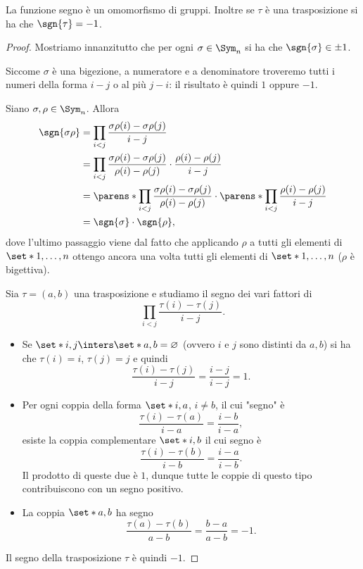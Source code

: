 \begin{proposition}
    {}{}
    La funzione segno è un omomorfismo di gruppi. Inoltre se $\tau$ è una trasposizione si ha che $\sgn{\tau} = -1$. 
\end{proposition}
\begin{proof}
     Mostriamo innanzitutto che per ogni $\sigma \in \Sym_n$ si ha che $\sgn{\sigma} \in {\pm 1}$.
    
    Siccome $\sigma$ è una bigezione, a numeratore e a denominatore troveremo tutti i numeri della forma $i - j$ o al più $j - i$: il risultato è quindi $1$ oppure $-1$.

     Siano $\sigma, \rho \in \Sym_n$. Allora \begin{align*}
        \sgn{\sigma\rho} &= \prod_{i < j} \frac{\sigma\rho(i) - \sigma\rho(j)}{i - j}\\
        &= \prod_{i < j} \frac{\sigma\rho(i) - \sigma\rho(j)}{\rho(i) - \rho(j)} \cdot \frac{\rho(i) - \rho(j)}{i - j}\\
        &= \parens*{\prod_{i < j} \frac{\sigma\rho(i) - \sigma\rho(j)}{\rho(i) - \rho(j)}} \cdot  \parens*{\prod_{i < j} \frac{\rho(i) - \rho(j)}{i - j}}\\
        &= \sgn{\sigma} \cdot \sgn{\rho},
    \end{align*} dove l'ultimo passaggio viene dal fatto che applicando $\rho$ a tutti gli elementi di $\set*{1, \dots, n}$ ottengo ancora una volta tutti gli elementi di $\set*{1, \dots, n}$ ($\rho$ è bigettiva).
    
     Sia $\tau = (a, b)$ una trasposizione e studiamo il segno dei vari fattori di \[
        \prod_{i < j} \frac{\tau(i) - \tau(j)}{i -j}.
    \] \begin{itemize}
        \item Se $\set*{i, j} \inters \set*{a, b} = \varnothing$ (ovvero $i$ e $j$ sono distinti da $a, b$) si ha che $\tau(i) = i$, $\tau(j) = j$ e quindi \[
            \frac{\tau(i) - \tau(j)}{i - j} = \frac{i - j}{i - j} = 1.
        \] 
        \item Per ogni coppia della forma $\set*{i, a}$, $i \neq b$, il cui "segno" è \[
            \frac{\tau(i) - \tau(a)}{i - a} = \frac{i - b}{i - a},
        \] esiste la coppia complementare $\set*{i, b}$ il cui segno è \[
            \frac{\tau(i) - \tau(b)}{i - b} = \frac{i - a}{i - b}.
        \] Il prodotto di queste due è $1$, dunque tutte le coppie di questo tipo contribuiscono con un segno positivo.
        \item La coppia $\set*{a, b}$ ha segno \[
            \frac{\tau(a) - \tau(b)}{a - b} = \frac{b - a}{a - b} = -1.
        \] 
    \end{itemize}

    Il segno della trasposizione $\tau$ è quindi $-1$. 
\end{proof}

